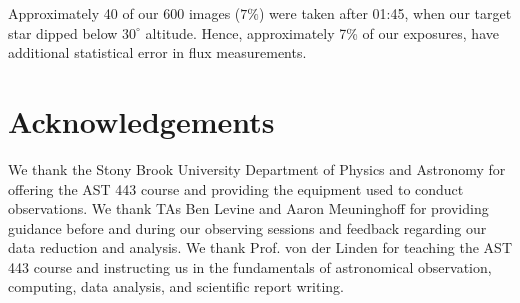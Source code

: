 \documentclass[twocolumn]{aastex631}
\begin{document}
Approximately 40 of our 600 images ($7\%$) were taken after 01:45, when our target star dipped below $30^\circ$ altitude. Hence, approximately 7\% of our exposures, have additional statistical error in flux measurements.

\section{Acknowledgements} \label{sec:acknow}
\begin{acknowledgments}
We thank the Stony Brook University Department of Physics and Astronomy for offering the AST 443 course and providing the equipment used to conduct observations. We thank TAs Ben Levine and Aaron Meuninghoff for providing guidance before and during our observing sessions and feedback regarding our data reduction and analysis. We thank Prof. von der Linden for teaching the AST 443 course and instructing us in the fundamentals of astronomical observation, computing, data analysis, and scientific report writing.
\end{acknowledgments}

%

\vspace{5mm}


\end{document}
